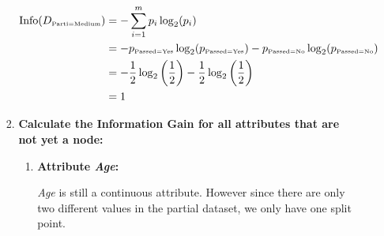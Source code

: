 \documentclass[
english,
smallborders
]{i6prcsht}
\newcommand{\OfSpecificValue}[3]{_{\text{\tiny #1#2#3}}}
\begin{document}
\begin{solution}
\begin{enumerate}
\begin{enumerate}
\begin{enumerate}
				                  \begin{alignat*}{2}
					                  \text{Info}(D\OfSpecificValue{Parti}{=}{Medium}) & = -\sum_{i=1}^{m}p_i \log_2(p_i)                                                                                                                          \\
					                                                                   & = -p\OfSpecificValue{Passed}{=}{Yes} \log_2(p\OfSpecificValue{Passed}{=}{Yes})- p\OfSpecificValue{Passed}{=}{No} \log_2(p\OfSpecificValue{Passed}{=}{No}) \\
					                                                                   & = -\frac{1}{2} \log_2\left(\frac{1}{2}\right) - \frac{1}{2} \log_2\left(\frac{1}{2}\right)                                                                \\
					                                                                   & = 1                                                                                                                                                       \\
				                  \end{alignat*}
				                  
				            \item \textbf{Calculate the Information Gain for all attributes that are not yet a node:}
				                  
				                  \begin{enumerate}
					                  \item \textbf{Attribute \textit{Age}:}
					                        
					                        \textit{Age} is still a continuous attribute. However since there are only two different values in the partial dataset, we only have one split point.
					                        

\end{enumerate}
\end{enumerate}
\end{enumerate}
\end{enumerate}
\end{solution}
\end{document}
